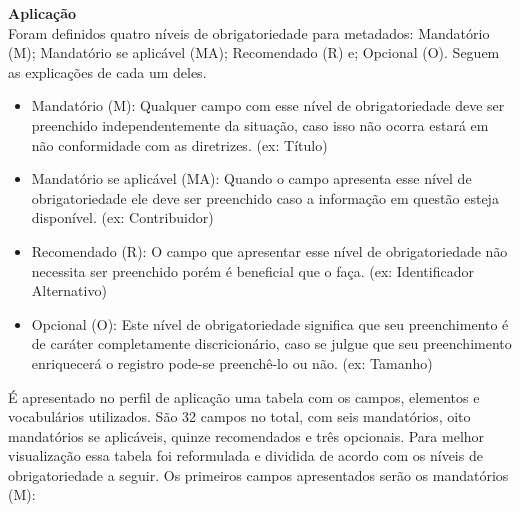\documentclass[12pt,hidelinks]{article}
\begin{document}
	\textbf{Aplicação}\\
	
	Foram definidos quatro níveis de obrigatoriedade para metadados: Mandatório (M); Mandatório se aplicável (MA); Recomendado (R) e; Opcional (O). Seguem as explicações de cada um deles.
	
	\begin{itemize}
	    \item Mandatório (M): Qualquer campo com esse nível de obrigatoriedade deve ser preenchido independentemente da situação, caso isso não ocorra estará em não conformidade com as diretrizes. (ex: Título)
        \item Mandatório se aplicável (MA): Quando o campo apresenta esse nível de obrigatoriedade ele deve ser preenchido caso a informação em questão esteja disponível. (ex: Contribuidor)
        \item Recomendado (R): O campo que apresentar esse nível de obrigatoriedade não necessita ser preenchido porém é beneficial que o faça. (ex: Identificador Alternativo)
        \item Opcional (O): Este nível de obrigatoriedade significa que seu preenchimento é de caráter completamente discricionário, caso se julgue que seu preenchimento enriquecerá o registro pode-se preenchê-lo ou não. (ex: Tamanho)
	\end{itemize}
	
	É apresentado no perfil de aplicação uma tabela  com os campos, elementos e vocabulários utilizados. São 32 campos no total, com seis mandatórios, oito mandatórios se aplicáveis, quinze recomendados e três opcionais. Para melhor visualização essa tabela foi reformulada e dividida de acordo com os níveis de obrigatoriedade a seguir. Os primeiros campos apresentados serão os mandatórios (M):
	
	\newpage
\end{document}
